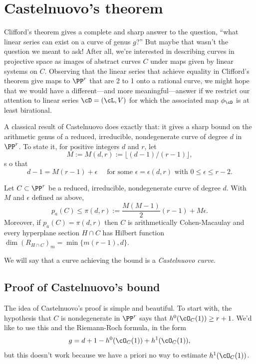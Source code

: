  \section{Castelnuovo's theorem}\label{CastelnuovoSection}

Clifford's theorem gives a complete and sharp answer to the question, ``what linear series can exist on a curve of genus $g$?''
But maybe that wasn't the question we meant to ask! After all, we're interested in describing curves in projective space as images of abstract curves $C$ under maps given by linear systems on $C$. Observing that the linear series that achieve equality in Clifford's theorem give maps to $\PP^r$ that are 2 to 1 onto a rational curve, we might hope that we would have a different---and more meaningful---answer if we  restrict our attention to linear series $\cD = (\cL,V)$ for which the associated map $\phi_\cD$ is at least  birational. 

A classical result of Castelnuovo does exactly that: it gives a sharp bound on the arithmetic genus of a reduced, irreducible, nondegenerate curve of degree $d$ in $\PP^r$. To state it, for positive integers $d$ and $r$, let 
$$
M := M(d,r) := \lfloor(d-1)/(r-1)\rfloor,
$$s
o that
$$
 d -1 = M(r-1) + \epsilon \quad \text{ for some $\epsilon = \epsilon(d,r)$ with }0 \leq \epsilon \leq r-2. 
$$

\begin{theorem}\label{Castelnuovo's bound}
Let $C \subset \PP^r$ be a reduced, irreducible, nondegenerate curve of degree $d$. With $M$ and $\epsilon$ defined
as above,
$$
p_a(C) \leq \pi(d,r) := \frac{M(M-1)}{2}(r-1) + M\epsilon.
$$
Moreover, if $p_a(C) = \pi(d,r)$  then $C$ is arithmetically Cohen-Macaulay and every hyperplane
section $H\cap C$ has Hilbert function
$
\dim (R_{H\cap C})_{m} = \min\{m(r-1), d\}.
$
\end{theorem}

We will say that a curve achieving the bound is a \emph{Castelnuovo curve}.  

\subsection{Proof of Castelnuovo's bound}

The idea of Castelnuovo's proof is simple and beautiful. To start with, the hypothesis that $C$ is nondegenerate in $\PP^r$ says that $h^0(\cO_C(1)) \geq r+1$. We'd like to use this and the Riemann-Roch formula, in the form
$$
g = d+1 - h^0(\cO_C(1)) + h^1(\cO_C(1)),
$$
but this doesn't work because we have a priori no way to estimate $h^1(\cO_C(1))$.

